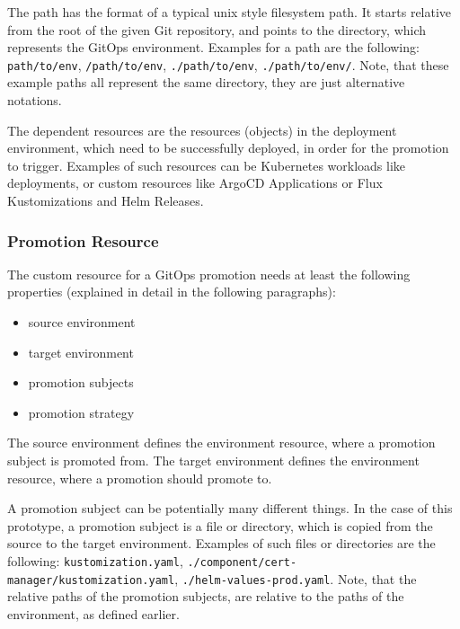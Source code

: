 The path has the format of a typical unix style filesystem path.
It starts relative from the root of the given Git repository,
and points to the directory, which represents the GitOps environment.
Examples for a path are the following:
\lstinline|path/to/env|,
\lstinline|/path/to/env|,
\lstinline|./path/to/env|,
\lstinline|./path/to/env/|.
Note, that these example paths all represent the same directory,
they are just alternative notations.

The dependent resources are the resources (objects) in the deployment environment,
which need to be successfully deployed, in order for the promotion to trigger.
Examples of such resources can be Kubernetes workloads like deployments,
or custom resources like ArgoCD Applications or Flux Kustomizations and Helm Releases.

\subsubsection*{Promotion Resource}

The custom resource for a GitOps promotion
needs at least the following properties (explained in detail in the following paragraphs):

\begin{itemize}
	\item source environment
	\item target environment
	\item promotion subjects
	\item promotion strategy
\end{itemize}

The source environment defines the environment resource,
where a promotion subject is promoted from.
The target environment defines the environment resource,
where a promotion should promote to.


A promotion subject can be potentially many different things.
In the case of this prototype,
a promotion subject is a file or directory,
which is copied from the source to the target environment.
Examples of such files or directories are the following:
\lstinline|kustomization.yaml|,
\lstinline|./component/cert-manager/kustomization.yaml|,
\lstinline|./helm-values-prod.yaml|.
Note, that the relative paths of the promotion subjects,
are relative to the paths of the environment, as defined earlier.

